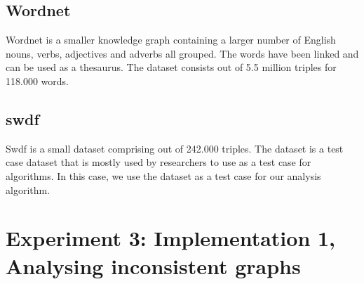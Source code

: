 \documentclass[11pt,letterpaper ,oneside ]{book}
\begin{document}
	\subsection{Wordnet}
	Wordnet is a smaller knowledge graph containing a larger number of English nouns, verbs, adjectives and adverbs all grouped. The words have been linked and can be used as a thesaurus. The dataset consists out of 5.5 million triples for 118.000 words.
	
	\subsection{swdf}
	Swdf is a small dataset comprising out of 242.000 triples. The dataset is a test case dataset that is mostly used by researchers to use as a test case for algorithms. In this case, we use the dataset as a test case for our analysis algorithm.
	
	\section{Experiment 3: Implementation 1, Analysing inconsistent graphs}
	
\end{document}
